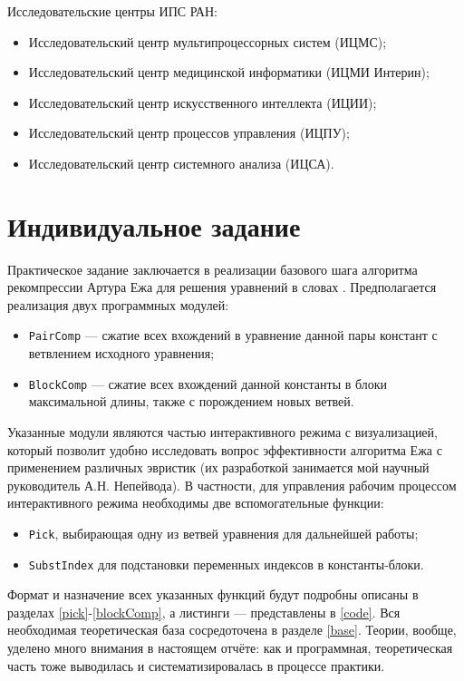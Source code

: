 \documentclass[12pt]{article}
\begin{document}
Исследовательские центры ИПС РАН:
\begin{itemize}
\item Исследовательский центр мультипроцессорных систем (ИЦМС);
\item Исследовательский центр медицинской информатики (ИЦМИ Интерин);
\item Исследовательский центр искусственного интеллекта (ИЦИИ); 
\item Исследовательский центр процессов управления (ИЦПУ);
\item Исследовательский центр системного анализа (ИЦСА).
\end{itemize}



\section{Индивидуальное задание}

Практическое задание заключается в реализации базового шага алгоритма
рекомпрессии Артура Ежа для решения уравнений в словах \cite{jez}.
Предполагается реализация двух программных модулей:
\begin{itemize}
\item \texttt{PairComp} --- сжатие всех вхождений в уравнение данной пары
констант с ветвлением исходного уравнения;
\item \texttt{BlockComp} --- сжатие всех вхождений данной константы в блоки
максимальной длины, также с порождением новых ветвей.
\end{itemize}
Указанные модули являются частью интерактивного режима с визуализацией,
который позволит удобно исследовать вопрос эффективности алгоритма Ежа с
применением различных эвристик (их разработкой занимается мой научный
руководитель А.Н. Непейвода). В частности, для управления рабочим процессом
интерактивного режима необходимы две вспомогательные функции:
\begin{itemize}
\item \texttt{Pick}, выбирающая одну из ветвей уравнения для дальнейшей работы;
\item \texttt{SubstIndex} для подстановки переменных индексов в константы-блоки.
\end{itemize}
Формат и назначение всех указанных функций будут подробны описаны в разделах 
\ref{pick}-\ref{blockComp}, а листинги --- представлены в \ref{code}. Вся
необходимая теоретическая база сосредоточена в разделе \ref{base}. Теории,
вообще, уделено много внимания в настоящем отчёте: как и программная,
теоретическая часть тоже выводилась и систематизировалась в процессе практики.
\end{document}
